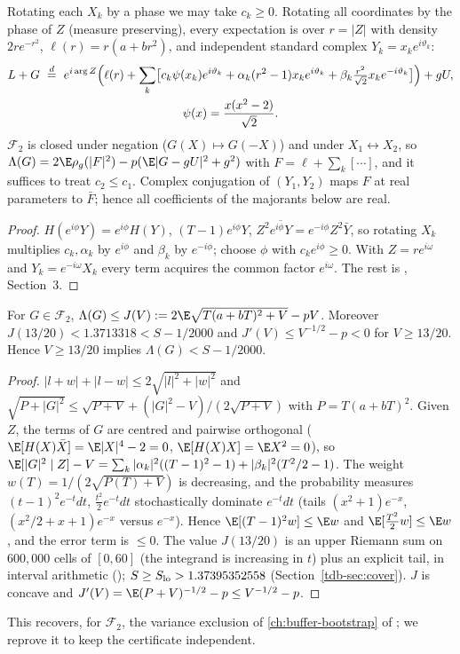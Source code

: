 \begin{lemma}\label{tdb-lem:real}
Rotating each $X_k$ by a phase we may take $c_k\ge0$. Rotating all coordinates by the phase of $Z$ (measure preserving), every
expectation is over $r=|Z|$ with density $2re^{-r^2}$, $\ell(r)=r(a+br^2)$, and independent standard complex $Y_k=x_ke^{i\vartheta_k}$:
\begin{multline*}
L+G\ \overset{d}{=}\ e^{i\arg Z}\Bigl(\ell(r)+\sum_k\bigl[c_k\psi(x_k)e^{i\vartheta_k}+\alpha_k(r^2-1)x_ke^{i\vartheta_k}+\beta_k\tfrac{r^2}{\sqrt2}x_ke^{-i\vartheta_k}\bigr]\Bigr)+gU,\\
\psi(x)=\frac{x(x^2-2)}{\sqrt2}.
\end{multline*}
$\mathcal F_2$ is closed under negation ($G(X)\mapsto G(-X)$) and under $X_1\leftrightarrow X_2$, so $\Lambda(G)=2\E\rho_g(|F|^2)-p(\E|G-gU|^2+g^2)$
with $F=\ell+\sum_k[\cdots]$, and it suffices to treat $c_2\le c_1$. Complex conjugation of $(Y_1,Y_2)$ maps $F$ at real parameters to $\bar F$;
hence all coefficients of the majorants below are real.
\end{lemma}
\begin{proof}
$H(e^{i\phi}Y)=e^{i\phi}H(Y)$, $(T-1)e^{i\phi}Y$, $Z^2\overline{e^{i\phi}Y}=e^{-i\phi}Z^2\bar Y$, so rotating $X_k$ multiplies $c_k,\alpha_k$ by $e^{i\phi}$
and $\beta_k$ by $e^{-i\phi}$; choose $\phi$ with $c_ke^{i\phi}\ge0$. With $Z=re^{i\omega}$ and $Y_k=e^{-i\omega}X_k$ every term acquires the
common factor $e^{i\omega}$. The rest is \Sd, Section~3.
\end{proof}

\begin{lemma}\label{tdb-lem:trace}
For $G\in\mathcal F_2$, $\Lambda(G)\le J(V):=2\E\sqrt{T(a+bT)^2+V}-pV$. Moreover $J(13/20)<1.3713318<S-1/2000$ and $J'(V)\le V^{-1/2}-p<0$ for $V\ge13/20$.
Hence $V\ge13/20$ implies $\Lambda(G)<S-1/2000$.
\end{lemma}
\begin{proof}
$|l+w|+|l-w|\le2\sqrt{|l|^2+|w|^2}$ and $\sqrt{P+|G|^2}\le\sqrt{P+V}+(|G|^2-V)/(2\sqrt{P+V})$ with $P=T(a+bT)^2$. Given $Z$, the terms of
$G$ are centred and pairwise orthogonal ($\E[H(X)\bar X]=\E|X|^4-2=0$, $\E[H(X)X]=\E X^2=0$), so
$\E[|G|^2\mid Z]-V=\sum_k|\alpha_k|^2((T-1)^2-1)+|\beta_k|^2(T^2/2-1)$. The weight $w(T)=1/(2\sqrt{P(T)+V})$ is decreasing, and the probability
measures $(t-1)^2e^{-t}dt$, $\tfrac{t^2}2e^{-t}dt$ stochastically dominate $e^{-t}dt$ (tails $(x^2+1)e^{-x}$, $(x^2/2+x+1)e^{-x}$ versus $e^{-x}$).
Hence $\E[(T-1)^2w]\le\E w$ and $\E[\tfrac{T^2}2w]\le\E w$, and the error term is $\le0$. The value $J(13/20)$ is an upper Riemann sum on
$600{,}000$ cells of $[0,60]$ (the integrand is increasing in $t$) plus an explicit tail, in interval arithmetic ();
$S\ge S_{\rm lo}>1.37395352558$ (Section~\ref{tdb-sec:cover}). $J$ is concave and $J'(V)=\E(P+V)^{-1/2}-p\le V^{-1/2}-p$.
\end{proof}
This recovers, for $\mathcal F_2$, the variance exclusion of \autoref{ch:buffer-bootstrap} of \Sd; we reprove it to keep the certificate independent.

